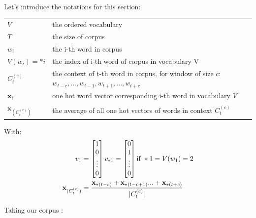 Let's introduce the notations for this section:

{\ttfamily
\begin{table}[H]
    \centering
    \begin{tabular}{ll}
        \toprule
        $V$       	   	 &    the ordered vocabulary \\
        $T$    		   	 &    the size of corpus \\
        $w_i$          	 &    the i-th word in corpus \\
        $V(w_{i}) = *i$       &    the index of i-th word of corpus in vocabulary V\\
        $C_t^{(c)}$      &    the context of t-th word in corpus, for window of size $c$: $w_{t-c}, ..., w_{t-1}, w_{t+1}, ... ,w_{t+c}$\\
		$\mathbf{x}_i$ 				& one hot word vector corresponding i-th word in vocabulary $V$ \\
        $\mathbf{x}_{(C_t^{(c)})}$ 	& the average of all one hot vectors of words in context $C_t^{(c)}$ \\
        \bottomrule
    \end{tabular}
\end{table}
}

With:
\begin{align}
	v_1 &= 
	\begin{bmatrix} 
		1 \\
		0 \\
		\vdots\\
		0
	\end{bmatrix}
	v_{*1} = 
	\begin{bmatrix} 
		0 \\
		1 \\
		\vdots\\
		0
	\end{bmatrix}
	\textnormal{if } *1 = V(w_1) = 2\\
	\mathbf{x}_{(C_t^{(c)})} &= \frac{\mathbf{x}_{*(t-c)} + \mathbf{x}_{*(t-c+1)} ... + \mathbf{x}_{*(t+c)}}{|C_t^{(c)}|}
\end{align}

Taking our corpus :

